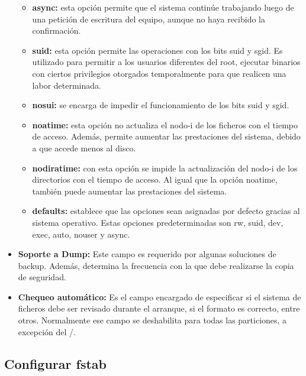 \begin{itemize}
\begin{itemize}
					\item \textbf{async:} esta opción permite que el sistema continúe trabajando luego de una petición de escritura del equipo, aunque no haya recibido la confirmación.
				
					\item \textbf{suid:} esta opción permite las operaciones con los bits suid y sgid. Es utilizado para permitir a los usuarios diferentes del root, ejecutar binarios con ciertos privilegios otorgados temporalmente para que realicen una labor determinada.
					
					\item \textbf{nosui:} se encarga de impedir el funcionamiento de los bits suid y sgid.
					
					\item \textbf{noatime:} esta opción no actualiza el nodo-i de los ficheros con el tiempo de acceso. Además, permite aumentar las prestaciones del sistema, debido a que accede menos al disco.
					
					\item \textbf{nodiratime:} con esta opción se impide la actualización del nodo-i de los directorios con el tiempo de acceso. Al igual que la opción noatime, también puede aumentar las prestaciones del sistema.
				
					\item \textbf{defaults:} establece que las opciones sean asignadas por defecto gracias al sistema operativo. Estas opciones predeterminadas son  rw, suid, dev, exec, auto, nouser y async.
				
				\end{itemize}
	
				\item \textbf{Soporte a Dump:} Este campo es requerido por algunas soluciones de backup. Además, determina la frecuencia con la que debe realizarse la copia de seguridad.
				
				\item \textbf{Chequeo automático:} Es el campo encargado de especificar si el sistema de ficheros debe ser revisado durante el arranque, si el formato es correcto, entre otros. Normalmente ese campo se deshabilita para todas las particiones, a excepción del /.
				
			\end{itemize}
		
			\subsection{Configurar fstab}
			
